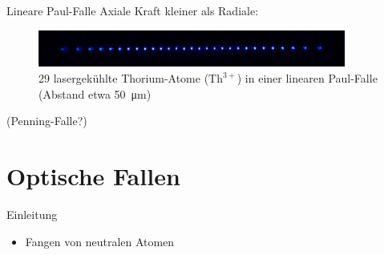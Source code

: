 \documentclass[12pt,xcolor=dvipsnames]{beamer}
\begin{document}
\begin{frame}{Lineare Paul-Falle}
Axiale Kraft kleiner als Radiale:
\begin{figure}[h]
	\centering
	\includegraphics[width=0.9\textwidth]{./figures/29_laser_cooled_ion_chain.jpg}
	\caption{29 lasergekühlte Thorium-Atome ($\mathrm{Th}^{3+}$) in einer linearen Paul-Falle (Abstand etwa \SI{50}{\micro\metre}) \cite{campbell}}
\end{figure}

(Penning-Falle?)

\end{frame}

\section{Optische Fallen}

\begin{frame}{Einleitung}
	\begin{itemize}
		\item Fangen von neutralen Atomen
	\end{itemize}
\end{frame}
\end{document}
